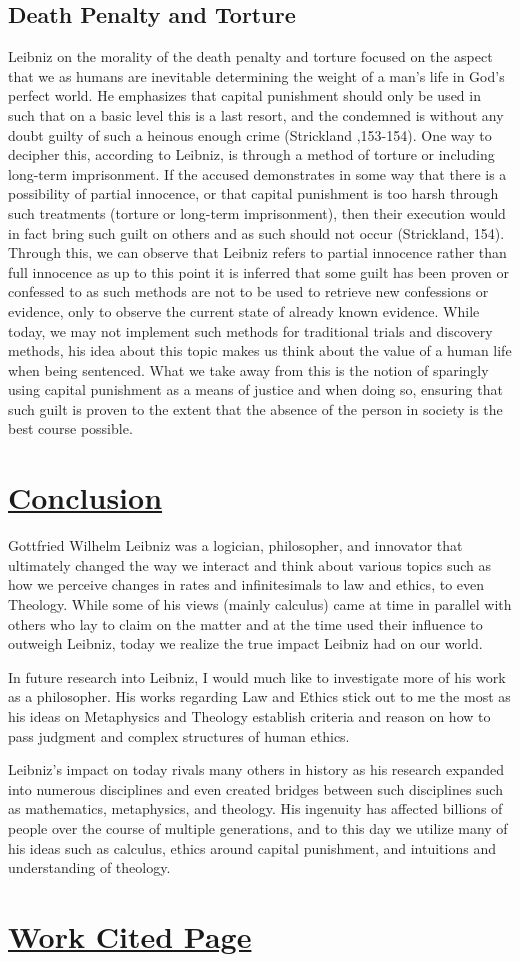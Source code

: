 \documentclass[12pt]{article}
\begin{document}
\subsection*{Death Penalty and Torture}
Leibniz on the morality of the death penalty and torture focused on the aspect that we as humans are inevitable determining the weight of a man's life in God's perfect world.
He emphasizes that capital punishment should only be used in such that on a basic level this is a last resort, and the condemned is without any doubt guilty of such a heinous enough crime (Strickland ,153-154).
One way to decipher this, according to Leibniz, is through a method of torture or including long-term imprisonment.
If the accused demonstrates in some way that there is a possibility of partial innocence, or that capital punishment is too harsh through such treatments (torture or long-term imprisonment), then their execution would in fact bring such guilt on others and as such should not occur (Strickland, 154).
Through this, we can observe that Leibniz refers to partial innocence rather than full innocence as up to this point it is inferred that some guilt has been proven or confessed to as such methods are not to be used to retrieve new confessions or evidence, only to observe the current state of already known evidence.
While today, we may not implement such methods for traditional trials and discovery methods, his idea about this topic makes us think about the value of a human life when being sentenced.
What we take away from this is the notion of sparingly using capital punishment as a means of justice and when doing so, ensuring that such guilt is proven to the extent that the absence of the person in society is the best course possible.

    \section*{\underline{Conclusion}}
Gottfried Wilhelm Leibniz was a logician, philosopher, and innovator that ultimately changed the way we interact and think about various topics such as how we perceive changes in rates and infinitesimals to law and ethics, to even Theology.
While some of his views (mainly calculus) came at time in parallel with others who lay to claim on the matter and at the time used their influence to outweigh Leibniz, today we realize the true impact Leibniz had on our world.\par
In future research into Leibniz, I would much like to investigate more of his work as a philosopher.
His works regarding Law and Ethics stick out to me the most as his ideas on Metaphysics and Theology establish criteria and reason on how to pass judgment and complex structures of human ethics. \par
Leibniz's impact on today rivals many others in history as his research expanded into numerous disciplines and even created bridges between such disciplines such as mathematics, metaphysics, and theology.
His ingenuity has affected billions of people over the course of multiple generations, and to this day we utilize many of his ideas such as calculus, ethics around capital punishment, and intuitions and understanding of theology.
\newpage
\section*{\underline{Work Cited Page}}


    
\end{document}
